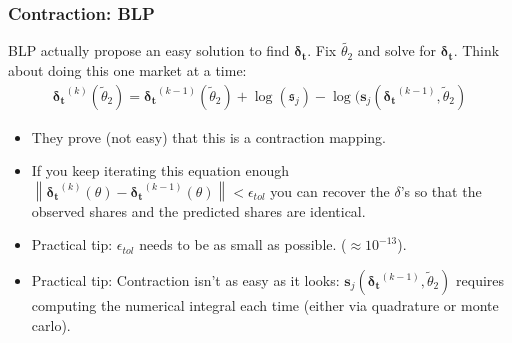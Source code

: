 \documentclass[xcolor=pdftex,dvipsnames,table,mathserif,aspectratio=169]{beamer}
\newcommand{\norm}[1]{\left\lVert#1\right\rVert}
\begin{document}
\begin{frame}
\frametitle{Contraction: BLP}
BLP actually propose an easy solution to find $\boldsymbol{\delta_t}$. Fix $\widetilde{\theta_2}$ and solve for $\boldsymbol{\delta_t}$. Think about doing this one market at a time:
\begin{align*}
\boldsymbol{\delta_t}^{(k)}(\widetilde{\theta}_2) = \boldsymbol{\delta_t}^{(k-1)}(\widetilde{\theta}_2) + \log(\boldsymbol{\mathfrak{s}}_{j}) - \log(\boldsymbol{s}_{j}(\boldsymbol{\delta_t}^{(k-1)}, \widetilde{\theta}_2)
\end{align*}
 \begin{itemize}
 \item They prove (not easy) that this is a \alert{contraction mapping}.
 \item If you keep iterating this equation enough $\norm{\boldsymbol{\delta_{t}}^{(k)}(\theta) - \boldsymbol{\delta_{t}}^{(k-1)}(\theta)} < \epsilon_{tol}$ you can recover the $\delta$'s so that the observed shares and the predicted shares are identical.
 \item Practical tip: $\epsilon_{tol}$ needs to be as small as possible. ($\approx 10^{-13}$).
 \item Practical tip: Contraction isn't as easy as it looks:  $\boldsymbol{s}_{j}(\boldsymbol{\delta_t}^{(k-1)}, \widetilde{\theta}_2)$ requires computing the numerical integral each time (either via quadrature or monte carlo).
  \end{itemize}
 \end{frame}
 
\end{document}
